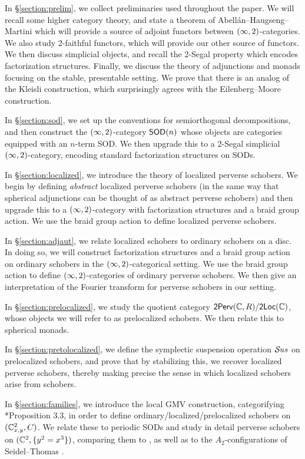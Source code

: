 In \S\ref{section:prelim}, we collect preliminaries used throughout the paper. We will recall some higher category theory, and state a theorem of Abell\'an--Haugseng--Martini \cite{abellanFreeFibrationsLax2026} which will provide a source of adjoint functors between $(\infty,2)$-categories. We also study 2-faithful functors, which will provide our other source of functors. We then discuss simplicial objects, and recall the 2-Segal property which encodes factorization structures. Finally, we discuss the theory of adjunctions and monads focusing on the stable, presentable setting. We prove that there is an analog of the Kleisli construction, which surprisingly agrees with the Eilenberg--Moore construction.

In \S\ref{section:sod}, we set up the conventions for semiorthogonal decompositions, and then construct the $(\infty,2)$-category $\mathsf{SOD}(n)$ whose objects are categories equipped with an $n$-term SOD. We then upgrade this to a 2-Segal simplicial $(\infty,2)$-category, encoding standard factorization structures on SODs.

In \S\ref{section:localized}, we introduce the theory of localized perverse schobers. We begin by defining \textit{abstract} localized perverse schobers (in the same way that spherical adjunctions can be thought of as abstract perverse schobers) and then upgrade this to a $(\infty,2)$-category with factorization structures and a braid group action. We use the braid group action to define localized perverse schobers.

In \S\ref{section:adjaut}, we relate localized schobers to ordinary schobers on a disc. In doing so, we will construct factorization structures and a braid group action on ordinary schobers in the $(\infty,2)$-categorical setting. We use the braid group action to define $(\infty,2)$-categories of ordinary perverse schobers. We then give an interpretation of the Fourier transform for perverse schobers in our setting.

In \S\ref{section:prelocalized}, we study the quotient category $\mathsf{2Perv}(\mathbb{C},R)/\mathsf{2Loc}(\mathbb{C})$, whose objects we will refer to as prelocalized schobers. We then relate this to spherical monads.

In \S\ref{section:pretolocalized}, we define the symplectic suspension operation $\mathcal{S}\kern -.5pt us$ on prelocalized schobers, and prove that by stabilizing this, we recover localized perverse schobers, thereby making precise the sense in which localized schobers arise from schobers.

In \S\ref{section:families}, we introduce the local GMV construction, categorifying \cite{gelfandMicrolocalPerverseSheaves2005}*{Proposition 3.3}, in order to define ordinary/localized/prelocalized schobers on $(\mathbb{C}^2_{x,y},C)$. We relate these to periodic SODs and study in detail perverse schobers on $(\mathbb{C}^2,\{y^2=x^3\})$, comparing them to \cites{macphersonPerverseSheavesSingularities1988,dyckerhoffPerverseSchobersCoxeter2025}, as well as to the $A_2$-configurations of Seidel--Thomas \cite{seidelBraidGroupActions2000}.

